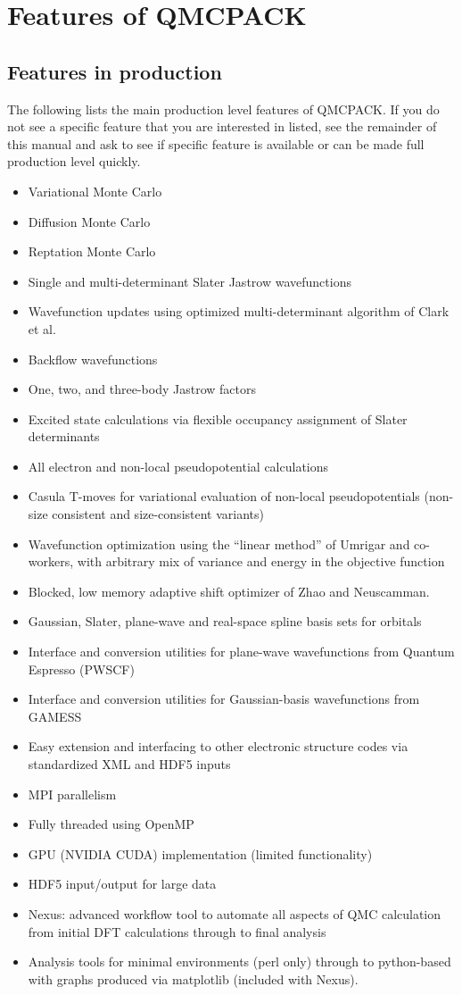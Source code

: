 \chapter{Features of QMCPACK}
\label{chap:features}
\section{Features in production}
The following lists the main production level features of QMCPACK. If
you do not see a specific feature that you are interested in listed,
see the remainder of this manual and ask to see if specific feature is
available or can be made full production level quickly.

\begin{itemize}
\item Variational Monte Carlo
\item Diffusion Monte Carlo
\item Reptation Monte Carlo
\item Single and multi-determinant Slater Jastrow wavefunctions
\item Wavefunction updates using optimized multi-determinant algorithm of Clark et al.
\item Backflow wavefunctions
\item One, two, and three-body Jastrow factors
\item Excited state calculations via flexible occupancy assignment of Slater determinants
\item All electron and non-local pseudopotential calculations
\item Casula T-moves for variational evaluation of non-local
  pseudopotentials (non-size consistent and size-consistent variants)
\item Wavefunction optimization using the ``linear method'' of Umrigar
  and co-workers, with arbitrary mix of variance and energy in the
  objective function
\item Blocked, low memory adaptive shift optimizer of Zhao and Neuscamman. 
\item Gaussian, Slater, plane-wave and real-space spline basis sets for orbitals
\item Interface and conversion utilities for plane-wave wavefunctions from Quantum Espresso (PWSCF)
\item Interface and conversion utilities for Gaussian-basis wavefunctions from GAMESS
\item Easy extension and interfacing to other electronic structure codes via standardized XML and HDF5 inputs
\item MPI parallelism
\item Fully threaded using OpenMP
\item GPU (NVIDIA CUDA) implementation (limited functionality)
\item HDF5 input/output for large data
\item Nexus: advanced workflow tool to automate all aspects of QMC calculation from initial DFT calculations through to final analysis
\item Analysis tools for minimal environments (perl only) through to
  python-based with graphs produced via matplotlib (included with Nexus).
\end{itemize}

